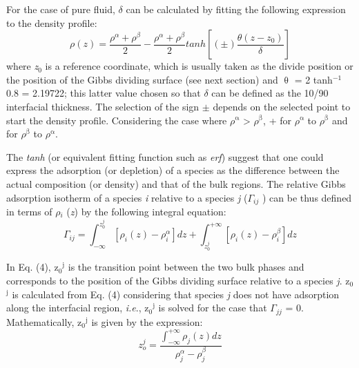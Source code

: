 \documentclass[9pt,bestpractices]{livecoms}
\begin{document}
For the case of pure fluid, {${\delta}$} can be calculated by fitting the following expression to the density profile\citep{evans1992}:
\begin{equation}
\rho\left(z\right)=\frac{\rho^{\alpha}+\rho^{\beta}}{2}-\frac{\rho^{\alpha}+\rho^{\beta}}{2}tanh\left[\left(\pm\right)\frac{\theta\left(z-z_{0}\right)}{\delta}\right]
\end{equation}
where \textit{z}$_{0}$ is a reference coordinate, which is usually taken as the
divide position or the position of the Gibbs dividing surface (see next
section) and {${\uptheta}$} = 2 tanh$^{-1}$ 0.8 = 2.19722; this latter value
chosen so that {${\delta}$} can be defined as the 10/90 interfacial thickness.
The selection of the sign ${\pm}$ depends on the selected point to start the
density profile. Considering the case where ${\rho}$$^{\mathrm{{\upalpha}}}$
{\textgreater} ${\rho}$$^{\mathrm{{\upbeta}}}$,  + for
${\rho}$$^{\mathrm{{\upalpha}}}$ to ${\rho}$$^{\mathrm{{\upbeta}}}$ and
\textendash{} for ${\rho}$$^{\mathrm{{\upbeta}}}$ to
${\rho}$$^{\mathrm{{\upalpha}}}$.

The \textit{tanh} (or equivalent fitting function such as \textit{erf}) suggest
that one could express the adsorption (or depletion) of a species as the
difference between the actual composition (or density) and that of the bulk
regions. The relative Gibbs adsorption isotherm of a species \textit{i}
relative to a species \textit{j} (${\Gamma}$$_{ij}$ ) can be thus defined in
terms of ${\rho}$$_{i}$ (\textit{z}) by the following integral
equation\citep{evans1992}:
\begin{equation}
\varGamma_{ij}=\int_{-\infty}^{z_{0}^{j}}\left[\rho_{i}\left(z\right)-\rho{}_{i}^{\alpha}\right]dz+\int_{z_{0}^{j}}^{+\infty}\left[\rho_{i}\left(z\right)-\rho{}_{i}^{\beta}\right]dz
\end{equation}

In Eq. (4), z$_{0}$$^{\mathrm{j}}$ is the transition point between the two bulk
phases and corresponds to the position of the Gibbs dividing surface relative
to a species \textit{j}. z$_{0}$$^{\mathrm{j}}$ is calculated from Eq. (4)
considering that species \textit{j} does not have adsorption along the
interfacial region, \textit{i.e}., z$_{0}$$^{\mathrm{j}}$ is solved for the
case that ${\Gamma}$$_{jj}$ = 0. Mathematically, z$_{0}$$^{\mathrm{j}}$ is
given by the expression:
\begin{equation}
z_{o}^{j}=\frac{\int_{-\infty}^{+\infty}\rho_{j}\left(z\right)dz}{\rho_{j}^{\alpha}-\rho_{j}^{\beta}}
\end{equation}
\end{document}

